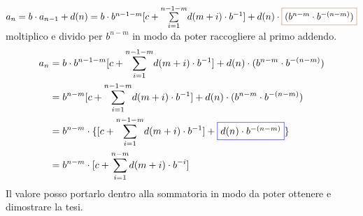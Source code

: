 \begin{flushleft}
\begin{boxA}
        $a_n = b \cdot a_{n-1} + d(n) = b \cdot b^{n-1-m} [c + \underset{i=1}{\overset{n-1-m}{\sum}} d(m+i) \cdot b^{-1}] + d(n) \cdot \fcolorbox{brown}{white}{$(b^{n-m} \cdot b^{-(n-m)})$}$ moltiplico e divido per $b^{n-m}$ in modo da poter raccogliere al primo addendo.
        \begin{align*}
            a_n &= b \cdot b^{n-1-m} [c + \underset{i=1}{\overset{n-1-m}{\sum}} d(m+i) \cdot b^{-1}] + d(n) \cdot (b^{n-m} \cdot b^{-(n-m)}) \\
            &= b^{n-m} [c + \underset{i=1}{\overset{n-1-m}{\sum}} d(m+i) \cdot b^{-1}] + d(n) \cdot (b^{n-m} \cdot b^{-(n-m)}) \\
            &= b^{n-m} \cdot \{[c + \underset{i=1}{\overset{n-1-m}{\sum}} d(m+i) \cdot b^{-1}] + \fcolorbox{blue}{white}{$d(n) \cdot b^{-(n-m)}$}\} \\
            &= b^{n-m} \cdot [c + \underset{i = 1}{\overset{n-m}{\sum}} d(m + i) \cdot b^{-i}]
        \end{align*}
        Il valore  posso portarlo dentro alla sommatoria in modo da poter ottenere e dimostrare la tesi.
    \end{boxA}
\end{flushleft}

